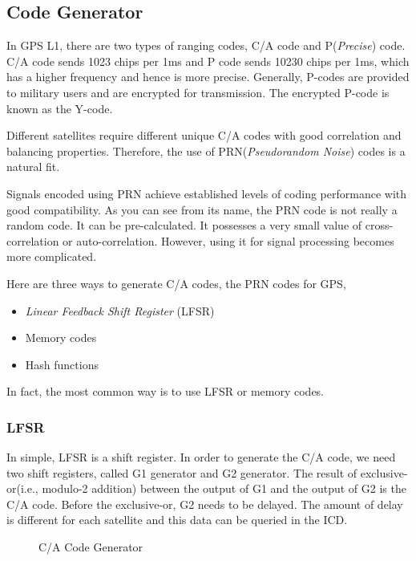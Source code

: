 \subsection{Code Generator}
In GPS L1, there are two types of ranging codes, C/A code and P(\textit{Precise}) code. C/A code sends 1023 chips per 1ms and P code sends 10230 chips per 1ms, which has a higher frequency and hence is more precise. Generally, P-codes are provided to military users and are encrypted for transmission. The encrypted P-code is known as the Y-code\cite{RN195}.

Different satellites require different unique C/A codes with good correlation and balancing properties. Therefore, the use of PRN(\textit{Pseudorandom Noise}) codes is a natural fit\cite{RN197}.

Signals encoded using PRN achieve established levels of coding performance with good compatibility. As you can see from its name, the PRN code is not really a random code. It can be pre-calculated. It possesses a very small value of cross-correlation or auto-correlation. However, using it for signal processing becomes more complicated\cite{RN200}.

Here are three ways to generate C/A codes\cite{RN196}, the PRN codes for GPS,
\begin{itemize}
    \item \textit{Linear Feedback Shift Register} (LFSR)
    \item Memory codes
    \item Hash functions
\end{itemize}
In fact, the most common way is to use LFSR or memory codes. 

\subsubsection{LFSR}
In simple, LFSR is a shift register. In order to generate the C/A code, we need two shift registers, called G1 generator and G2 generator. The result of exclusive-or(i.e., modulo-2 addition) between the output of G1 and the output of G2 is the C/A code. Before the exclusive-or, G2 needs to be delayed. The amount of delay is different for each satellite and this data can be queried in the ICD.

\begin{figure}[!htbp]
    \centering
    
    \caption{C/A Code Generator}
    \label{fig:ca_gen}
\end{figure}

